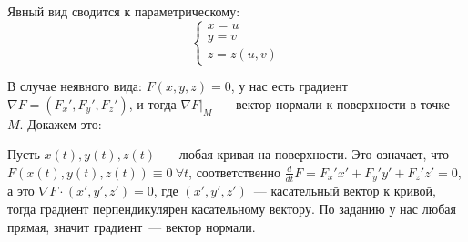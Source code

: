 \documentclass[main]{subfiles}
\begin{document}
Явный вид сводится к параметрическому:
\[\begin{cases}
        x = u \\
        y = v \\
        z = z(u,v)
    \end{cases}\]

В случае неявного вида: $F(x,y,z) = 0$,
у нас есть градиент $\nabla F = (F_x', F_y', F_z')$, и тогда
$\nabla F |_M$~--- вектор нормали к поверхности в точке $M$. Докажем это:

Пусть $x(t), y(t), z(t)$~--- любая кривая на поверхности.
Это означает, что $F(x(t), y(t), z(t)) \equiv 0\ \forall t$, соответственно
$\frac{d}{dt}F = F_x' x' + F_y' y' + F_z' z' =0$, а это
$\nabla F \cdot (x', y', z') = 0$, где
$(x', y', z')$~--- касательный вектор к кривой,
тогда градиент перпендикулярен касательному вектору.
По заданию у нас любая прямая, значит градиент~--- вектор нормали.
\end{document}
